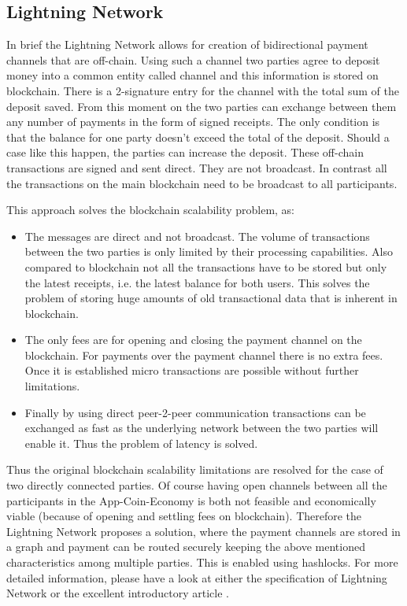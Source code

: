 \subsection{Lightning Network}
In brief the Lightning Network allows for creation of bidirectional payment channels that are off-chain. \cite{LighthingNetwork}
Using such a channel two parties agree to deposit money into a common entity called channel and this information is stored on blockchain. There is a 2-signature entry for the channel with the total sum of the deposit saved. From this moment on the two parties can exchange between them any number of payments in the form of signed receipts. The only condition is that the balance for one party doesn't exceed the total of the deposit. Should a case like this happen, the parties can increase the deposit. These off-chain transactions are signed and sent direct. They are not broadcast. In contrast all the transactions on the main blockchain need to be broadcast to all participants. 

This approach solves the blockchain scalability problem, as:

\begin{itemize}
    \item The messages are direct and not broadcast. The volume of transactions between the two parties is only limited by their processing capabilities. Also compared to blockchain not all the transactions have to be stored but only the latest receipts, i.e. the latest balance for both users. This solves the problem of storing huge amounts of old transactional data that is inherent in blockchain.
    \item The only fees are for opening and closing the payment channel on the blockchain. For payments over the payment channel there is no extra fees. Once it is established micro transactions are possible without further limitations.
    \item Finally by using direct peer-2-peer communication transactions can be exchanged as fast as the underlying network between the two parties will enable it. Thus the problem of latency is solved.
\end{itemize}

Thus the original blockchain scalability limitations are resolved for the case of two directly connected parties. Of course having open channels between all the participants in the App-Coin-Economy is both not feasible and economically viable (because of opening and settling fees on blockchain). Therefore the Lightning Network proposes a solution, where the payment channels are stored in a graph and payment can be routed securely keeping the above mentioned characteristics among multiple parties. This is enabled using hashlocks. For more detailed information, please have a look at either the specification of Lightning Network or the excellent introductory article \cite{starkness}.



